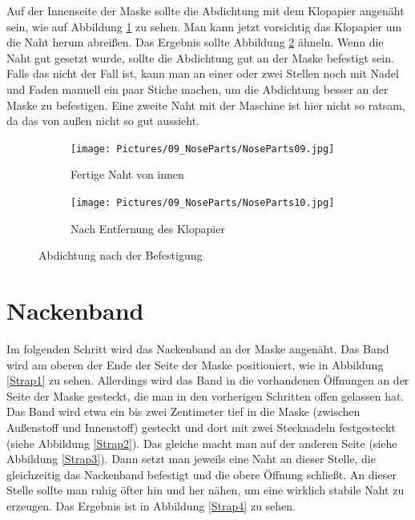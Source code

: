 \documentclass[12pt,parskip=full]{scrartcl}
\begin{document}
Auf der Innenseite der Maske sollte die Abdichtung mit dem Klopapier angenäht sein, wie auf Abbildung \ref{Nose09} zu sehen. Man kann jetzt vorsichtig das Klopapier um die Naht herum abreißen. Das Ergebnis sollte Abbildung \ref{Nose10} ähneln. Wenn die Naht gut gesetzt wurde, sollte die Abdichtung gut an der Maske befestigt sein. Falls das nicht der Fall ist, kann man an einer oder zwei Stellen noch mit Nadel und Faden manuell ein paar Stiche machen, um die Abdichtung besser an der Maske zu befestigen. Eine zweite Naht mit der Maschine ist hier nicht so ratsam, da das von außen nicht so gut aussieht. 

\begin{figure}[ht]
    \vspace{0.5cm}
    \centering
    \begin{subfigure}{0.48\textwidth}
        \centering
        \texttt{[image: Pictures/09\_NoseParts/NoseParts09.jpg]}
        \caption{Fertige Naht von innen}
        \label{Nose09}
    \end{subfigure}
    \begin{subfigure}{0.48\textwidth}
        \centering
        \texttt{[image: Pictures/09\_NoseParts/NoseParts10.jpg]}
        \caption{Nach Entfernung des Klopapier}
        \label{Nose10}
    \end{subfigure}
    \caption{Abdichtung nach der Befestigung}
    \label{NoseRes}
\end{figure}

\section{Nackenband}
Im folgenden Schritt wird das Nackenband an der Maske angenäht. Das Band wird am oberen der Ende der Seite der Maske positioniert, wie in Abbildung \ref{Strap1} zu sehen. Allerdings wird das Band in die vorhandenen Öffnungen an der Seite der Maske gesteckt, die man in den vorherigen Schritten offen gelassen hat. Das Band wird etwa ein bis zwei Zentimeter tief in die Maske (zwischen Außenstoff und Innenstoff) gesteckt und dort mit zwei Stecknadeln festgesteckt (siehe Abbildung \ref{Strap2}). Das gleiche macht man auf der anderen Seite (siehe Abbildung \ref{Strap3}). Dann setzt man jeweils eine Naht an dieser Stelle, die gleichzeitig das Nackenband befestigt und die obere Öffnung schließt. An dieser Stelle sollte man ruhig öfter hin und her nähen, um eine wirklich stabile Naht zu erzeugen. Das Ergebnis ist in Abbildung \ref{Strap4} zu sehen. 
\end{document}
